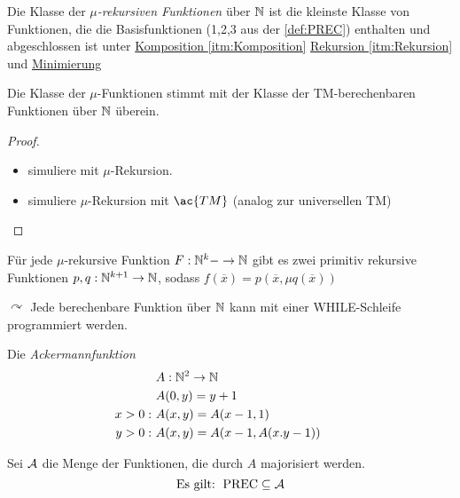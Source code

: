 \begin{Def}[name={[Klasse der $\mu$-rekursiven Funktionen]}]
	Die Klasse der \emph{$\mu$-rekursiven Funktionen} über $\mathbb{N}$ ist die kleinste Klasse von Funktionen, die die Basisfunktionen (1,2,3 aus der \autoref{def:PREC}) enthalten und abgeschlossen ist unter \hyperref[itm:Komposition]{Komposition \ref*{itm:Komposition}} \hyperref[itm:Rekursion]{Rekursion \ref*{itm:Rekursion}} und \hyperref[def:Minimierung]{Minimierung}
\end{Def}
\begin{Satz}[name={[$\mu$-Funktionen-Klasse $\hat=$ Klasse der \acs*{TM}-berechenbaren Fkt.]}]
	Die Klasse der $\mu$-Funktionen stimmt mit der Klasse der \ac{TM}-berechenbaren Funktionen über $\mathbb{N}$ überein.
\end{Satz}
\begin{proof}\
	\begin{itemize}
	\item simuliere  mit $\mu$-Rekursion.
	\item simuliere $\mu$-Rekursion mit $\ac{TM}$ (analog zur universellen \ac{TM}) \qedhere
	\end{itemize}
\end{proof}
\begin{Satz}[Kleene]
	Für jede $\mu$-rekursive Funktion $F: \N^k-\->\N$ gibt es zwei primitiv rekursive Funktionen $p,q:\N^{k+1}\->\N$, sodass $f(\overline{x})=p(\overline{x},\mu q(\overline{x}))$
\end{Satz}
$\curvearrowright$ Jede berechenbare Funktion über $\mathbb{N}$ kann mit einer WHILE-Schleife programmiert werden.
\begin{Def}[name={[Ackermannfunktion]}]
	Die \emph{Ackermannfunktion}
	\begin{align*}
		&A:\N^2\->\N\\
		&A(0,y)=y+1\\
		x>0:\ &A(x,y)=A(x-1,1)\\
		y>0:\ &A(x,y)=A(x-1,A(x.y-1)) \tag*{\qedhere}
	\end{align*}
\end{Def}
\begin{Satz}
	Sei $\mathcal{A}$ die Menge der Funktionen, die durch $A$ majorisiert werden.
	\[ \text{Es gilt: }\operatorname{PREC}\subseteq \mathcal{A} \]\vspace{-2em}
\end{Satz}
